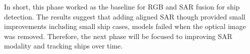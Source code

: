 In short, this phase worked as the baseline for RGB and SAR fusion for ship detection. The results suggest that adding aligned SAR though provided small improvements including small ship cases, models failed when the optical image was removed. Therefore, the next phase will be focused to improving SAR modality and tracking ships over time.